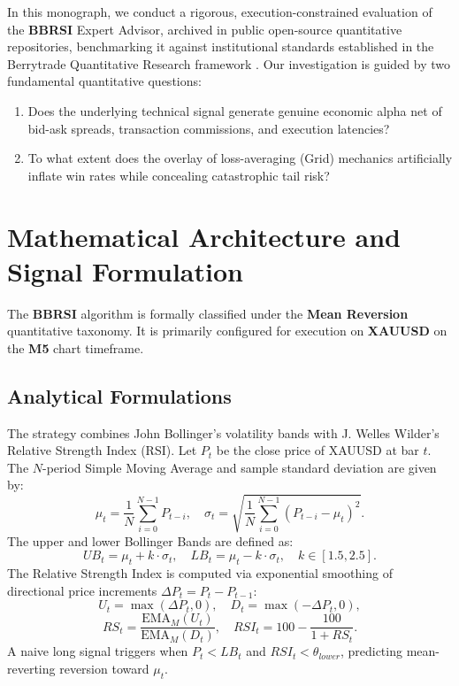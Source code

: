 \documentclass[11pt,a4paper]{article}
\begin{document}
In this monograph, we conduct a rigorous, execution-constrained evaluation of the \textbf{BBRSI} Expert Advisor, archived in public open-source quantitative repositories, benchmarking it against institutional standards established in the Berrytrade Quantitative Research framework \cite{artsu2026illusion}. Our investigation is guided by two fundamental quantitative questions:
\begin{enumerate}
    \item Does the underlying technical signal generate genuine economic alpha net of bid-ask spreads, transaction commissions, and execution latencies?
    \item To what extent does the overlay of loss-averaging (Grid) mechanics artificially inflate win rates while concealing catastrophic tail risk?
\end{enumerate}

\section{Mathematical Architecture and Signal Formulation}
The \textbf{BBRSI} algorithm is formally classified under the \textbf{Mean Reversion} quantitative taxonomy. It is primarily configured for execution on \textbf{XAUUSD} on the \textbf{M5} chart timeframe.

\subsection{Analytical Formulations}

The strategy combines John Bollinger's volatility bands with J. Welles Wilder's Relative Strength Index (RSI).
Let $P_t$ be the close price of XAUUSD at bar $t$. The $N$-period Simple Moving Average and sample standard deviation are given by:
\begin{equation}
\mu_t = \frac{1}{N} \sum_{i=0}^{N-1} P_{t-i}, \quad \sigma_t = \sqrt{\frac{1}{N} \sum_{i=0}^{N-1} (P_{t-i} - \mu_t)^2}.
\end{equation}
The upper and lower Bollinger Bands are defined as:
\begin{equation}
UB_t = \mu_t + k \cdot \sigma_t, \quad LB_t = \mu_t - k \cdot \sigma_t, \quad k \in [1.5, 2.5].
\end{equation}
The Relative Strength Index is computed via exponential smoothing of directional price increments $\Delta P_t = P_t - P_{t-1}$:
\begin{equation}
U_t = \max(\Delta P_t, 0), \quad D_t = \max(-\Delta P_t, 0),
\end{equation}
\begin{equation}
RS_t = \frac{\text{EMA}_M(U_t)}{\text{EMA}_M(D_t)}, \quad RSI_t = 100 - \frac{100}{1 + RS_t}.
\end{equation}
A naive long signal triggers when $P_t < LB_t$ and $RSI_t < \theta_{lower}$, predicting mean-reverting reversion toward $\mu_t$.
\end{document}
